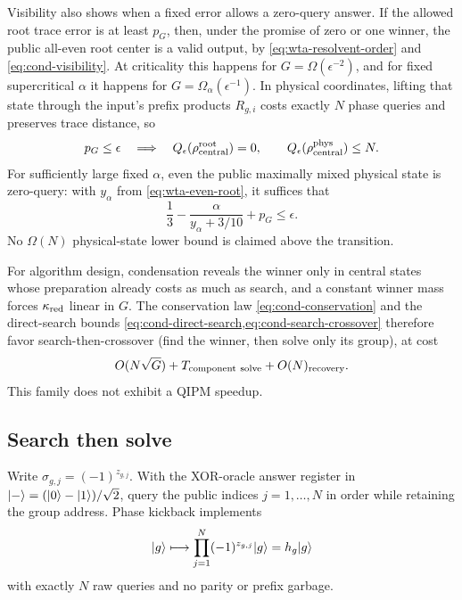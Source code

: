 Visibility also shows when a fixed error allows a zero-query answer.  If
the allowed root trace error is at least $p_G$, then, under the promise of
zero or one winner, the public all-even root center is a valid output, by \eqref{eq:wta-resolvent-order} and
\eqref{eq:cond-visibility}.  At criticality this
happens for $G=\Omega(\epsilon^{-2})$, and for fixed supercritical $\alpha$
it happens for $G=\Omega_\alpha(\epsilon^{-1})$.  In physical coordinates,
lifting that state through the input's prefix products $R_{g,i}$ costs
exactly $N$ phase queries and preserves trace distance, so
\begin{equation}
 p_G\le\epsilon\quad\Longrightarrow\quad
 Q_\epsilon(\rho_{\rm central}^{\rm root})=0,
 \qquad Q_\epsilon(\rho_{\rm central}^{\rm phys})\le N.
 \label{eq:wta-zero-query-boundary}
\end{equation}
For sufficiently large fixed $\alpha$, even the public maximally mixed
physical state is zero-query: with $y_\alpha$ from
\eqref{eq:wta-even-root}, it suffices that
\begin{equation}
 \frac13-\frac{\alpha}{y_\alpha+3/10}+p_G\le\epsilon.
 \label{eq:wta-public-physical-boundary}
\end{equation}
No $\Omega(N)$ physical-state lower bound is claimed above the transition.

For algorithm design, condensation reveals the winner only in central
states whose preparation already costs as much as search, and a constant
winner mass forces $\kappa_{\rm red}$ linear in $G$.  The conservation law
\eqref{eq:cond-conservation} and the direct-search bounds
\cref{eq:cond-direct-search,eq:cond-search-crossover} therefore favor
search-then-crossover (find the winner, then solve only its group), at
cost
\begin{equation}
 O(N\sqrt G)+T_{\rm component\ solve}+O(N)_{\rm recovery}.
 \label{eq:wta-architecture}
\end{equation}
This family does not exhibit a QIPM speedup.

\subsection{Search then solve}
\label{sec:wta-search}

Write $\sigma_{g,j}=(-1)^{z_{g,j}}$.  With the XOR-oracle answer register in
$\lvert -\rangle= (\lvert 0\rangle-\lvert 1\rangle)/\sqrt2$, query the public indices $j=1,\ldots,N$ in
order while retaining the group address.  Phase kickback implements
\begin{equation}
 \lvert g\rangle\longmapsto\prod_{j=1}^N(-1)^{z_{g,j}}\lvert g\rangle=h_g\lvert g\rangle
 \label{eq:wta-clean-marker}
\end{equation}
with exactly $N$ raw queries and no parity or prefix garbage.

